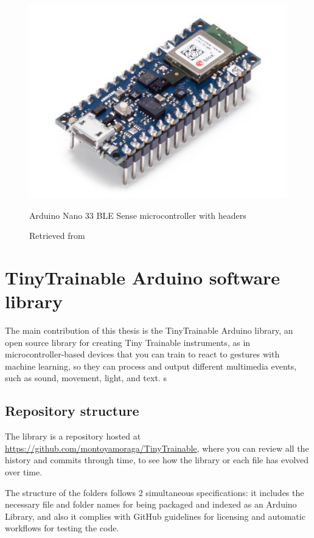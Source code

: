 \begin{figure}[ht]
  \centering
  \includegraphics[width=0.75\linewidth,height=0.25\textheight,keepaspectratio]{images/materials-arduino-nano-33-ble-sense.jpg}
  \caption{Arduino Nano 33 BLE Sense microcontroller with headers}
  \caption*{Retrieved from \cite{website-materials-arduino-nano-33-ble-sense}}
  \label{fig:materials-arduino-nano-33-ble-sense}
\end{figure}

\section{TinyTrainable Arduino software library}

The main contribution of this thesis is the TinyTrainable Arduino library, an open source library for creating Tiny Trainable instruments, as in microcontroller-based devices that you can train to react to gestures with machine learning, so they can process and output different multimedia events, such as sound, movement, light, and text.
s
\subsection{Repository structure}

The library is a repository hosted at \url{https://github.com/montoyamoraga/TinyTrainable}, where you can review all the history and commits through time, to see how the library or each file has evolved over time.

The structure of the folders follows 2 simultaneous specifications: it includes the necessary file and folder names for being packaged and indexed as an Arduino Library, and also it complies with GitHub guidelines for licensing and automatic workflows for testing the code.

